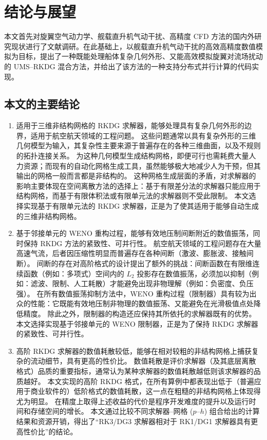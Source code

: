 
\chapter*{结论与展望}


本文首先对旋翼空气动力学、舰载直升机气动干扰、高精度 CFD 方法的国内外研究现状进行了文献调研。在此基础上，以舰载直升机气动干扰的高效高精度数值模拟为目标，提出了一种既能处理船体复杂几何外形、又能高效模拟旋翼对流场扰动的
UMS–RKDG 混合方法，并给出了该方法的一种支持分布式并行计算的代码实现。

\section*{本文的主要结论}
\begin{enumerate}[wide]
\item 适用于三维非结构网格的 RKDG 求解器，能够处理具有复杂几何外形的边界，适用于航空航天领域的工程问题。
这些问题通常以具有复杂外形的三维几何模型为输入，其复杂性主要来源于普遍存在的各种三维曲面，以及不规则的拓扑连接关系。
为这种几何模型生成结构网格，即便可行也需耗费大量人力资源；而现有的自动化网格生成工具，虽然能够极大地减少人为干预，但其输出的网格一般而言都是非结构的。
这种网格生成层面的矛盾，对求解器的影响主要体现在空间离散方法的选择上：基于有限差分法的求解器只能应用于结构网格，而基于有限体积法或有限单元法的求解器则不受此限制。
本文选择实现基于有限单元法的 RKDG 求解器，正是为了使其适用于能够自动生成的三维非结构网格。

\item 基于邻接单元的 WENO 重构过程，能够有效地压制间断附近的数值振荡，同时保持 RKDG 方法的紧致性、可并行性。
航空航天领域的工程问题存在大量高速气流，后者因压缩性明显而普遍存在各种间断（激波、膨胀波、接触间断）。
间断的存在对高阶格式的设计提出了额外的挑战：间断函数在有限维连续函数（例如：多项式）空间内的 $L_2$ 投影存在数值振荡，必须加以抑制（例如：滤波、限制、人工耗散）才能避免出现非物理解（例如：负密度、负压强）。
在所有数值振荡抑制方法中，WENO 重构过程（限制器）具有较为出众的性能：它既能有效地压制非物理的数值振荡、又能避免在光滑极值点处降低精度。
除此之外，限制器的构造还应保持其所依托的求解器既有的优势。本文选择实现基于邻接单元的 WENO 限制器，正是为了保持 RKDG 求解器的紧致性、可并行性。

\item 高阶 RKDG 求解器的数值耗散较低，能够在相对较粗的非结构网格上捕获复杂的流动细节，具有更高的性价比。
数值耗散是评价求解器（及其底层离散格式）品质的重要指标，通常认为某种求解器的数值耗散越低则该求解器的品质越好。
本文实现的高阶 RKDG 格式，在所有算例中都表现出低于（普遍应用于商业软件的）低阶格式的数值耗散，这一点在粗糙的非结构网格上体现得尤为明显。
在精度上取得上述收益的代价是程序开发难度的提升以及运行时间和存储空间的增长。
本文通过比较不同求解器--网格 ($p$--$h$) 组合给出的计算结果和资源开销，得出了“RK3/DG3 求解器相对于 RK1/DG1 求解器具有更高性价比”的结论。


\end{enumerate}

